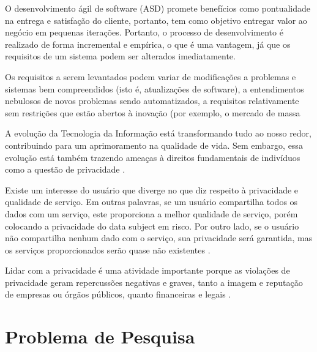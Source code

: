 O desenvolvimento ágil de software (ASD) promete benefícios como pontualidade na entrega e satisfação do cliente, portanto, tem como objetivo entregar valor ao negócio em pequenas iterações. Portanto, o processo de desenvolvimento é realizado de forma incremental e empírica, o que é uma vantagem, já que os requisitos de um sistema podem ser alterados imediatamente. 
 
Os requisitos a serem levantados podem variar de modificações a problemas e sistemas bem compreendidos (isto é, atualizações de software), a entendimentos nebulosos de novos problemas sendo automatizados, a requisitos relativamente sem restrições que estão abertos à inovação (por exemplo, o mercado de massa








A evolução da Tecnologia da Informação está transformando tudo ao nosso redor, contribuindo para um aprimoramento na qualidade de vida. Sem embargo, essa evolução está também trazendo ameaças à direitos fundamentais de indivíduos como a questão de privacidade \cite{elshekeil2017gdpr}.

Existe um interesse do usuário que diverge no que diz respeito à privacidade e qualidade de serviço. Em outras palavras, se um usuário compartilha todos os dados com um serviço, este proporciona a melhor qualidade de serviço, porém colocando a privacidade do data subject em risco. Por outro lado, se o usuário não compartilha nenhum dado com o serviço, sua privacidade será garantida, mas os serviços proporcionados serão quase não existentes \cite{EPICUREAN}.

Lidar com a privacidade é uma atividade importante porque as violações de privacidade geram repercussões negativas e graves, tanto a imagem e reputação de empresas ou órgãos públicos, quanto financeiras e legais \cite{Gharib2016}.


\section{Problema de Pesquisa}


